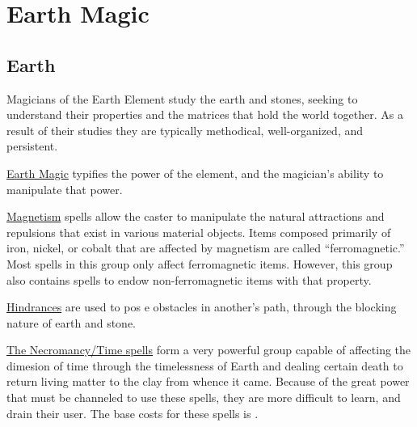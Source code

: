\chapter{Earth Magic}
\label{Ch:elemental-earth-magic}

\section{Earth}
Magicians of the Earth Element study the earth and stones, seeking to understand their properties and the matrices that hold the world together. As a result of their studies they are typically methodical, well-organized, and persistent.

\ul{Earth Magic} typifies the power of the element, and the magician’s ability to manipulate that power.

\ul{Magnetism} spells allow the caster to manipulate the natural attractions and repulsions that exist in various material objects. Items composed primarily of iron, nickel, or cobalt that are affected by magnetism are called “ferromagnetic.” Most spells in this group only affect ferromagnetic items. However, this group also contains spells to endow non-ferromagnetic items with that property.

\ul{Hindrances} are used to pos e obstacles in another’s path, through the blocking nature of earth and stone.

\ul{The Necromancy/Time spells} form a very powerful group capable of affecting the dimesion of time through the timelessness of Earth and dealing certain death to return living matter to the clay from whence it came. Because of the great power that must be channeled to use these spells, they are more difficult to learn, and drain their user. The base costs for these spells is .


